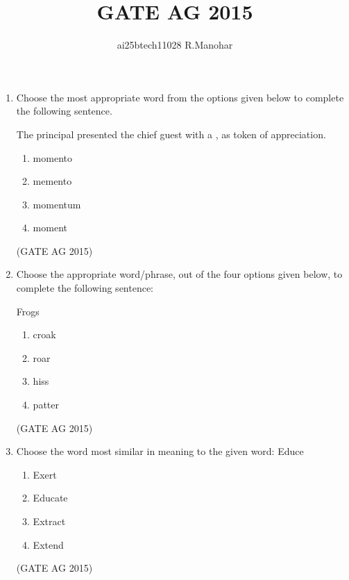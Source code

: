 \documentclass[journal,12pt,onecolumn]{IEEEtran}
\title{GATE AG 2015}
\author{ai25btech11028 R.Manohar}
\theoremstyle{remark}
\begin{document}
\maketitle

\begin{enumerate}
    

\item 
Choose the most appropriate word from the options given below to complete the following sentence.


The principal presented the chief guest with a \underline{\hspace{3cm}}, as token of appreciation.


\begin{multicols}{4}
\begin{enumerate}
\item  momento 
\item  memento 
\item  momentum 
\item  moment
\end{enumerate}
\end{multicols}
\hfill{(GATE AG 2015)}

\item 
Choose the appropriate word/phrase, out of the four options given below, to complete the following sentence:


Frogs \underline{\hspace{3cm}}


\begin{multicols}{4}
\begin{enumerate}
\item  croak
\item  roar  
\item  hiss 
\item  patter
\end{enumerate}
\end{multicols}
\hfill{(GATE AG 2015)}


\item 
Choose the word most similar in meaning to the given word:
Educe
\begin{multicols}{4}
\begin{enumerate}
\item  Exert 
\item  Educate 
\item  Extract 
\item  Extend
\end{enumerate}
\end{multicols}
\hfill{(GATE AG 2015)}


\end{enumerate}
\end{document}
